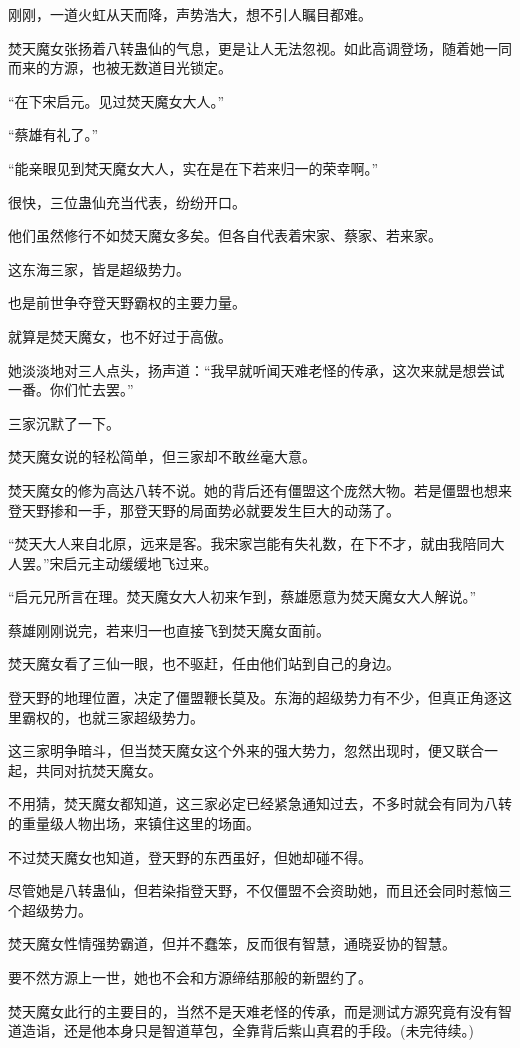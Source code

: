 \begin{this_body}
刚刚，一道火虹从天而降，声势浩大，想不引人瞩目都难。

焚天魔女张扬着八转蛊仙的气息，更是让人无法忽视。如此高调登场，随着她一同而来的方源，也被无数道目光锁定。

“在下宋启元。见过焚天魔女大人。”

“蔡雄有礼了。”

“能亲眼见到梵天魔女大人，实在是在下若来归一的荣幸啊。”

很快，三位蛊仙充当代表，纷纷开口。

他们虽然修行不如焚天魔女多矣。但各自代表着宋家、蔡家、若来家。

这东海三家，皆是超级势力。

也是前世争夺登天野霸权的主要力量。

就算是焚天魔女，也不好过于高傲。

她淡淡地对三人点头，扬声道：“我早就听闻天难老怪的传承，这次来就是想尝试一番。你们忙去罢。”

三家沉默了一下。

焚天魔女说的轻松简单，但三家却不敢丝毫大意。

焚天魔女的修为高达八转不说。她的背后还有僵盟这个庞然大物。若是僵盟也想来登天野掺和一手，那登天野的局面势必就要发生巨大的动荡了。

“焚天大人来自北原，远来是客。我宋家岂能有失礼数，在下不才，就由我陪同大人罢。”宋启元主动缓缓地飞过来。

“启元兄所言在理。焚天魔女大人初来乍到，蔡雄愿意为焚天魔女大人解说。”

蔡雄刚刚说完，若来归一也直接飞到焚天魔女面前。

焚天魔女看了三仙一眼，也不驱赶，任由他们站到自己的身边。

登天野的地理位置，决定了僵盟鞭长莫及。东海的超级势力有不少，但真正角逐这里霸权的，也就三家超级势力。

这三家明争暗斗，但当焚天魔女这个外来的强大势力，忽然出现时，便又联合一起，共同对抗焚天魔女。

不用猜，焚天魔女都知道，这三家必定已经紧急通知过去，不多时就会有同为八转的重量级人物出场，来镇住这里的场面。

不过焚天魔女也知道，登天野的东西虽好，但她却碰不得。

尽管她是八转蛊仙，但若染指登天野，不仅僵盟不会资助她，而且还会同时惹恼三个超级势力。

焚天魔女性情强势霸道，但并不蠢笨，反而很有智慧，通晓妥协的智慧。

要不然方源上一世，她也不会和方源缔结那般的新盟约了。

焚天魔女此行的主要目的，当然不是天难老怪的传承，而是测试方源究竟有没有智道造诣，还是他本身只是智道草包，全靠背后紫山真君的手段。(未完待续。)

\end{this_body}

